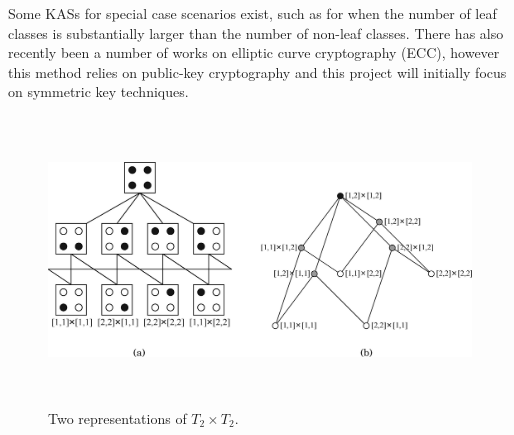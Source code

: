\documentclass[12pt, titlepage]{article}
\begin{document}
Some KASs for special case scenarios exist, such as for when the number of leaf classes is substantially larger than the number of non-leaf classes.\cite{largeLeaf} There has also recently been a number of works on elliptic curve cryptography (ECC)\cite{ecc1}\cite{ecc2}, however this method relies on public-key cryptography and this project will initially focus on symmetric key techniques.

\begin{figure}
\centerline{\includegraphics[height=3.0in,width=6in,angle=0]{geospatial.pdf}}
\caption{Two representations of $T_{2} \times T_{2}$.\cite{mainPaper}}
\label{fig:geospatial}
\end{figure}
\end{document}
